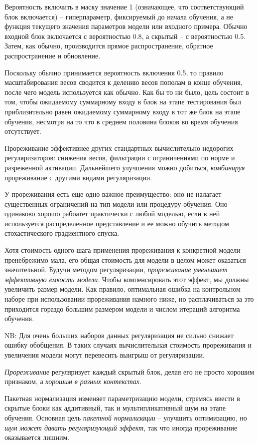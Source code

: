 \documentclass[%
	11pt,
	a4paper,
	utf8,
]{article}
\begin{document}
Вероятность включить в маску значение 1 (означающее, что соответствующий блок включается) -- гиперпараметр, фиксируемый до начала обучения, а не функция текущего значения параметров модели или входного примера. Обычно входной блок включается с вероятностью 0.8, а скрытый -- с вероятностью 0.5. Затем, как обычно, производится прямое распространение, обратное распространение и обновление.

Поскольку обычно принимается вероятность включения 0.5, то правило масштабирования весов сводится к делению весов пополам в конце обучения, после чего модель используется как обычно. Как бы то ни было, цель состоит в том, чтобы ожидаемому суммарному входу в блок на этапе тестирования был приблизительно равен ожидаемому суммарному входу в тот же блок на этапе обучения, несмотря на то что в среднем половина блоков во время обучения отсутствует.

Прореживание эффективнее других стандартных вычислительно недорогих регуляризаторов: снижения весов, фильтрации с ограничениями по норме и разреженной активации. Дальнейшего улучшения можно добиться, \emph{комбинируя} прореживание с другими видами регуляризации.

У прореживания есть еще одно важное преимущество: оно не налагает существенных ограничений на тип модели или процедуру обучения. Оно одинаково хорошо рабоатет практически с любой моделью, если в ней используется распределенное представление и ее можно обучить методом стохастического градиентного спуска. 

{\color{red} Хотя стоимость одного шага применения прореживания к конкретной модели пренебрежимо мала, его общая стоимость для модели в целом может оказаться значительной.} Будучи методом регуляризации, \emph{прореживание уменьшает эффективную емкость модели}. Чтобы компенсировать этот эффект, мы должны увеличить размер модели. Как правило, оптимальная ошибка на контрольном наборе при использовании прореживания намного ниже, но расплачиваться за это приходится гораздо большим размером модели и числом итераций алгоритма обучения.

NB: Для очень больших наборов данных регуляризация не сильно снижает ошибку обобщения. В таких случаях вычислительная стоимость прореживания и увеличения модели могут перевесить выигрыш от регуляризации.

\emph{Прореживание} регуляризует каждый скрытый блок, делая его не просто хорошим признаком, а \emph{хорошим в разных контекстах}.

Пакетная нормализация изменяет параметризацию модели, стремясь ввести в скрытые блоки как аддитивный, так и мультипликативный шум на этапе обучения. Основная цель \emph{пакетной нормализации} -- улучшить оптимизацию, но \emph{шум может давать регуляризующий эффект}, так что иногда прореживание оказывается лишним.
\end{document}
